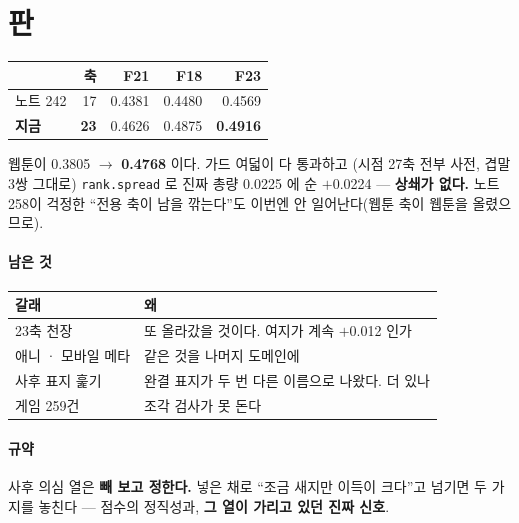 \documentclass[10pt]{article}
\begin{document}
\section{판}

\begin{center}\small
\begin{tabular}{lrrrr}
\hline
 & 축 & F21 & F18 & \textbf{F23} \\
\hline
노트 242 & 17 & 0.4381 & 0.4480 & 0.4569 \\
\textbf{지금} & \textbf{23} & 0.4626 & 0.4875 & \textbf{0.4916} \\
\hline
\end{tabular}
\end{center}

웹툰이 0.3805 $\to$ \textbf{0.4768} 이다. 가드 여덟이 다 통과하고
(시점 27축 전부 사전, 겹말 3쌍 그대로) \texttt{rank.spread} 로 진짜 총량
0.0225 에 순 $+$0.0224 --- \textbf{상쇄가 없다.} 노트 258이 걱정한 ``전용
축이 남을 깎는다''도 이번엔 안 일어난다(웹툰 축이 웹툰을 올렸으므로).

\paragraph{남은 것}
\begin{center}\small
\begin{tabular}{ll}
\hline
갈래 & 왜 \\
\hline
23축 천장 & 또 올라갔을 것이다. 여지가 계속 $+$0.012 인가 \\
애니 · 모바일 메타 & 같은 것을 나머지 도메인에 \\
사후 표지 훑기 & 완결 표지가 두 번 다른 이름으로 나왔다. 더 있나 \\
게임 259건 & 조각 검사가 못 돈다 \\
\hline
\end{tabular}
\end{center}

\paragraph{규약} 사후 의심 열은 \textbf{빼 보고 정한다.} 넣은 채로 ``조금
새지만 이득이 크다''고 넘기면 두 가지를 놓친다 --- 점수의 정직성과,
\textbf{그 열이 가리고 있던 진짜 신호}.
\end{document}
